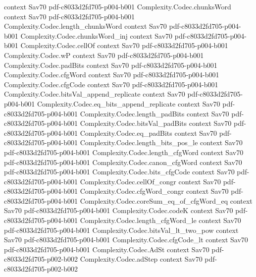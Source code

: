\begin{theorem}
  {context}
  {Sav70}
  {pdf-c8033d2fd705-p004-b001}
\proofstep
  {Complexity.Codec.chunksWord}
  {context}
  {Sav70}
  {pdf-c8033d2fd705-p004-b001}
\proofstep
  {Complexity.Codec.length_chunksWord}
  {context}
  {Sav70}
  {pdf-c8033d2fd705-p004-b001}
\proofstep
  {Complexity.Codec.chunksWord_inj}
  {context}
  {Sav70}
  {pdf-c8033d2fd705-p004-b001}
\proofstep
  {Complexity.Codec.cellOf}
  {context}
  {Sav70}
  {pdf-c8033d2fd705-p004-b001}
\proofstep
  {Complexity.Codec.wP}
  {context}
  {Sav70}
  {pdf-c8033d2fd705-p004-b001}
\proofstep
  {Complexity.Codec.padBits}
  {context}
  {Sav70}
  {pdf-c8033d2fd705-p004-b001}
\proofstep
  {Complexity.Codec.cfgWord}
  {context}
  {Sav70}
  {pdf-c8033d2fd705-p004-b001}
\proofstep
  {Complexity.Codec.cfgCode}
  {context}
  {Sav70}
  {pdf-c8033d2fd705-p004-b001}
\proofstep
  {Complexity.Codec.bitsVal_append_replicate}
  {context}
  {Sav70}
  {pdf-c8033d2fd705-p004-b001}
\proofstep
  {Complexity.Codec.eq_bits_append_replicate}
  {context}
  {Sav70}
  {pdf-c8033d2fd705-p004-b001}
\proofstep
  {Complexity.Codec.length_padBits}
  {context}
  {Sav70}
  {pdf-c8033d2fd705-p004-b001}
\proofstep
  {Complexity.Codec.bitsVal_padBits}
  {context}
  {Sav70}
  {pdf-c8033d2fd705-p004-b001}
\proofstep
  {Complexity.Codec.eq_padBits}
  {context}
  {Sav70}
  {pdf-c8033d2fd705-p004-b001}
\proofstep
  {Complexity.Codec.length_bits_pos_le}
  {context}
  {Sav70}
  {pdf-c8033d2fd705-p004-b001}
\proofstep
  {Complexity.Codec.length_cfgWord}
  {context}
  {Sav70}
  {pdf-c8033d2fd705-p004-b001}
\proofstep
  {Complexity.Codec.canon_cfgWord}
  {context}
  {Sav70}
  {pdf-c8033d2fd705-p004-b001}
\proofstep
  {Complexity.Codec.bits_cfgCode}
  {context}
  {Sav70}
  {pdf-c8033d2fd705-p004-b001}
\proofstep
  {Complexity.Codec.cellOf_congr}
  {context}
  {Sav70}
  {pdf-c8033d2fd705-p004-b001}
\proofstep
  {Complexity.Codec.cfgWord_congr}
  {context}
  {Sav70}
  {pdf-c8033d2fd705-p004-b001}
\proofstep
  {Complexity.Codec.coreSum_eq_of_cfgWord_eq}
  {context}
  {Sav70}
  {pdf-c8033d2fd705-p004-b001}
\proofstep
  {Complexity.Codec.codeK}
  {context}
  {Sav70}
  {pdf-c8033d2fd705-p004-b001}
\proofstep
  {Complexity.Codec.length_cfgWord_le}
  {context}
  {Sav70}
  {pdf-c8033d2fd705-p004-b001}
\proofstep
  {Complexity.Codec.bitsVal_lt_two_pow}
  {context}
  {Sav70}
  {pdf-c8033d2fd705-p004-b001}
\proofstep
  {Complexity.Codec.cfgCode_lt}
  {context}
  {Sav70}
  {pdf-c8033d2fd705-p004-b001}
\proofstep
  {Complexity.Codec.AdSt}
  {context}
  {Sav70}
  {pdf-c8033d2fd705-p002-b002}
\proofstep
  {Complexity.Codec.adStep}
  {context}
  {Sav70}
  {pdf-c8033d2fd705-p002-b002}

\end{theorem}
